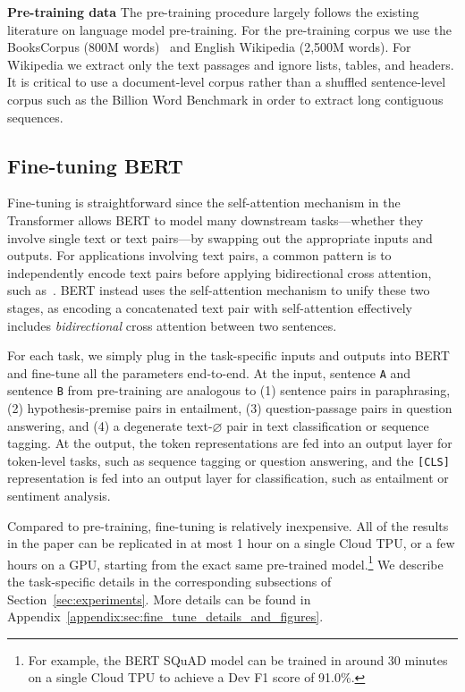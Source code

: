 \vspace{.3cm}
\noindent\textbf{Pre-training data}
The pre-training procedure largely follows the existing literature on language model pre-training. For the pre-training corpus we use the BooksCorpus (800M words)~\cite{zhu:2015} and English Wikipedia (2,500M words). For Wikipedia we extract only the text passages and ignore lists, tables, and headers. It is critical to use a document-level corpus rather than a shuffled sentence-level corpus such as the Billion Word Benchmark \cite{chelba-etal:2013:_one} in order to extract long contiguous sequences.

\subsection{Fine-tuning BERT}
\label{sec:finetuning_procedure}

Fine-tuning is straightforward since the self-attention mechanism in the Transformer allows BERT to model many downstream tasks---whether they involve single text or text pairs---by swapping out the appropriate inputs and outputs.
For applications involving text pairs, a common pattern is to independently encode text pairs before applying bidirectional cross attention, such as~. BERT instead uses the self-attention mechanism to unify these two stages, as encoding 
a concatenated text pair with self-attention effectively includes \emph{bidirectional} cross attention between two sentences. 


For each task, we simply plug in the task-specific inputs and outputs into BERT and fine-tune all the parameters end-to-end. 
%
At the input, sentence {\tt A} and sentence {\tt B} from pre-training are analogous to (1) sentence pairs in paraphrasing, (2) hypothesis-premise pairs in entailment, (3) question-passage pairs in question answering, and (4) a degenerate text-$\varnothing$ pair in text classification or sequence tagging. At the output, the token representations are fed into an output layer for token-level tasks, such as sequence tagging or question answering, and the {\tt [CLS]} representation is fed into an output layer for classification, such as entailment or sentiment analysis.


Compared to pre-training, fine-tuning is relatively inexpensive. All of the results in the paper can be replicated in at most 1 hour on a single Cloud TPU, or a few hours on a GPU, starting from the exact same pre-trained model.\footnote{For example, the BERT SQuAD model can be trained in around 30 minutes on a single Cloud TPU to achieve a Dev F1 score of 91.0\%.}
We describe the task-specific details in the corresponding subsections of Section~\ref{sec:experiments}. 
More details can be found in Appendix~\ref{appendix:sec:fine_tune_details_and_figures}.


